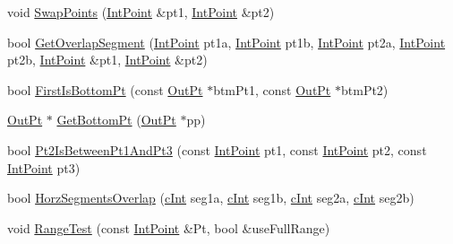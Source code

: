 \begin{DoxyCompactItemize}
\item 
void \mbox{\hyperlink{namespace_clipper_lib_af8338b22ca335b55a1fc1a17f0b0c453}{Swap\+Points}} (\mbox{\hyperlink{struct_clipper_lib_1_1_int_point}{Int\+Point}} \&pt1, \mbox{\hyperlink{struct_clipper_lib_1_1_int_point}{Int\+Point}} \&pt2)
\item 
bool \mbox{\hyperlink{namespace_clipper_lib_a8817de6dc5a080ead872b1373074c07f}{Get\+Overlap\+Segment}} (\mbox{\hyperlink{struct_clipper_lib_1_1_int_point}{Int\+Point}} pt1a, \mbox{\hyperlink{struct_clipper_lib_1_1_int_point}{Int\+Point}} pt1b, \mbox{\hyperlink{struct_clipper_lib_1_1_int_point}{Int\+Point}} pt2a, \mbox{\hyperlink{struct_clipper_lib_1_1_int_point}{Int\+Point}} pt2b, \mbox{\hyperlink{struct_clipper_lib_1_1_int_point}{Int\+Point}} \&pt1, \mbox{\hyperlink{struct_clipper_lib_1_1_int_point}{Int\+Point}} \&pt2)
\item 
bool \mbox{\hyperlink{namespace_clipper_lib_a9811846db2631994c7e6a54327bf251d}{First\+Is\+Bottom\+Pt}} (const \mbox{\hyperlink{struct_clipper_lib_1_1_out_pt}{Out\+Pt}} $\ast$btm\+Pt1, const \mbox{\hyperlink{struct_clipper_lib_1_1_out_pt}{Out\+Pt}} $\ast$btm\+Pt2)
\item 
\mbox{\hyperlink{struct_clipper_lib_1_1_out_pt}{Out\+Pt}} $\ast$ \mbox{\hyperlink{namespace_clipper_lib_a52148a9babd2c3227e9088881faa4fe5}{Get\+Bottom\+Pt}} (\mbox{\hyperlink{struct_clipper_lib_1_1_out_pt}{Out\+Pt}} $\ast$pp)
\item 
bool \mbox{\hyperlink{namespace_clipper_lib_a0a448254ee6419dfde0a539080502d88}{Pt2\+Is\+Between\+Pt1\+And\+Pt3}} (const \mbox{\hyperlink{struct_clipper_lib_1_1_int_point}{Int\+Point}} pt1, const \mbox{\hyperlink{struct_clipper_lib_1_1_int_point}{Int\+Point}} pt2, const \mbox{\hyperlink{struct_clipper_lib_1_1_int_point}{Int\+Point}} pt3)
\item 
bool \mbox{\hyperlink{namespace_clipper_lib_a8d010407c49e1ea2e092dd21d8684de4}{Horz\+Segments\+Overlap}} (\mbox{\hyperlink{namespace_clipper_lib_a7156730a24951629192d4831334bafaa}{c\+Int}} seg1a, \mbox{\hyperlink{namespace_clipper_lib_a7156730a24951629192d4831334bafaa}{c\+Int}} seg1b, \mbox{\hyperlink{namespace_clipper_lib_a7156730a24951629192d4831334bafaa}{c\+Int}} seg2a, \mbox{\hyperlink{namespace_clipper_lib_a7156730a24951629192d4831334bafaa}{c\+Int}} seg2b)
\item 
void \mbox{\hyperlink{namespace_clipper_lib_add09a980dfa1da81e1693a55cd912908}{Range\+Test}} (const \mbox{\hyperlink{struct_clipper_lib_1_1_int_point}{Int\+Point}} \&Pt, bool \&use\+Full\+Range)
\item 

\end{DoxyCompactItemize}
